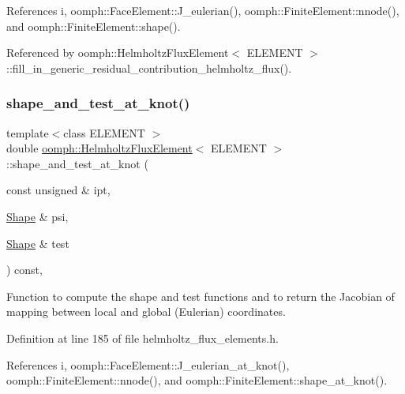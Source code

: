 References i, oomph\+::\+Face\+Element\+::\+J\+\_\+eulerian(), oomph\+::\+Finite\+Element\+::nnode(), and oomph\+::\+Finite\+Element\+::shape().



Referenced by oomph\+::\+Helmholtz\+Flux\+Element$<$ E\+L\+E\+M\+E\+N\+T $>$\+::fill\+\_\+in\+\_\+generic\+\_\+residual\+\_\+contribution\+\_\+helmholtz\+\_\+flux().

\mbox{\label{classoomph_1_1HelmholtzFluxElement_a463b7abfac1cc3aa698437b484b51683}} 
\subsubsection{\texorpdfstring{shape\+\_\+and\+\_\+test\+\_\+at\+\_\+knot()}{shape\_and\_test\_at\_knot()}}
{\footnotesize\ttfamily template$<$class E\+L\+E\+M\+E\+NT $>$ \\
double \hyperlink{classoomph_1_1HelmholtzFluxElement}{oomph\+::\+Helmholtz\+Flux\+Element}$<$ E\+L\+E\+M\+E\+NT $>$\+::shape\+\_\+and\+\_\+test\+\_\+at\+\_\+knot (\begin{DoxyParamCaption}\item[{const unsigned \&}]{ipt,  }\item[{\hyperlink{classoomph_1_1Shape}{Shape} \&}]{psi,  }\item[{\hyperlink{classoomph_1_1Shape}{Shape} \&}]{test }\end{DoxyParamCaption}) const\hspace{0.3cm}{\ttfamily [inline]}, {\ttfamily [protected]}}



Function to compute the shape and test functions and to return the Jacobian of mapping between local and global (Eulerian) coordinates. 



Definition at line 185 of file helmholtz\+\_\+flux\+\_\+elements.\+h.



References i, oomph\+::\+Face\+Element\+::\+J\+\_\+eulerian\+\_\+at\+\_\+knot(), oomph\+::\+Finite\+Element\+::nnode(), and oomph\+::\+Finite\+Element\+::shape\+\_\+at\+\_\+knot().

